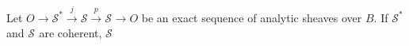 Let $O \to \mathcal{S}^* \xrightarrow{j} \mathcal{S} \xrightarrow{p} \mathcal{S}^{} \to O$ be an exact sequence of analytic sheaves over $B$. If $\mathcal{S}^*$ and $\mathcal{S}^{}$ are coherent, $\mathcal{S}$
